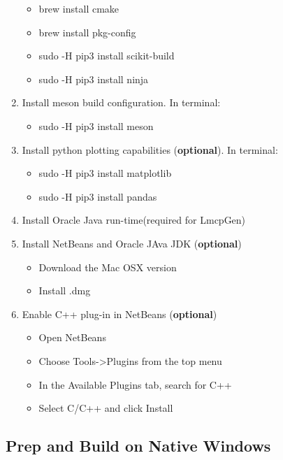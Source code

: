 \begin{enumerate}
  \begin{itemize}
  \item
    brew install cmake
  \item
    brew install pkg-config
  \item
    sudo -H pip3 install scikit-build
  \item
    sudo -H pip3 install ninja
  \end{itemize}
\item
  Install meson build configuration. In terminal:

  \begin{itemize}
  \tightlist
  \item
    sudo -H pip3 install meson
  \end{itemize}
\item
  Install python plotting capabilities (\textbf{optional}). In terminal:

  \begin{itemize}
  \item
    sudo -H pip3 install matplotlib
  \item
    sudo -H pip3 install pandas
  \end{itemize}
\item
  Install Oracle Java run-time(required for LmcpGen)
\item
  Install NetBeans and Oracle JAva JDK (\textbf{optional})

  \begin{itemize}
  \item
    Download the Mac OSX version
  \item
    Install .dmg
  \end{itemize}
\item
  Enable C++ plug-in in NetBeans (\textbf{optional})

  \begin{itemize}
  \item
    Open NetBeans
  \item
    Choose Tools-\textgreater{}Plugins from the top menu
  \item
    In the Available Plugins tab, search for C++
  \item
    Select C/C++ and click Install
  \end{itemize}
\end{enumerate}

\subsection{Prep and Build on Native
Windows}\label{prep-and-build-on-native-windows}


